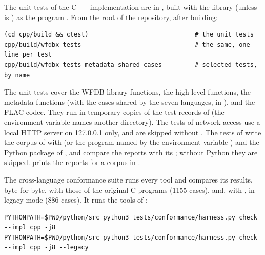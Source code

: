 The unit tests of the C++ implementation are in , built with the library
(unless  is ) as the program
. From the root of the repository, after building:

\begin{lstlisting}[style=shell]
(cd cpp/build && ctest)                             # the unit tests
cpp/build/wfdbx_tests                               # the same, one line per test
cpp/build/wfdbx_tests metadata_shared_cases         # selected tests, by name
\end{lstlisting}

The unit tests cover the WFDB library functions, the high-level functions, the metadata
functions (with the cases shared by the seven languages, in ),
 and the FLAC codec. They run in temporary copies of the test records
of  (the environment variable  names another
directory). The tests of network access use a local HTTP server on 127.0.0.1 only, and
are skipped without . The tests of  write the corpus of
 with  (or the program named by the
environment variable ) and the Python package of ,
and compare the reports with its ; without Python they are skipped.
 prints the reports for a corpus in .

The cross-language conformance suite runs every tool and compares its results, byte for
byte, with those of the original C programs (1155 cases), and, with , in
legacy mode (886 cases). It runs the tools of :

\begin{lstlisting}[style=shell]
PYTHONPATH=$PWD/python/src python3 tests/conformance/harness.py check --impl cpp -j8
PYTHONPATH=$PWD/python/src python3 tests/conformance/harness.py check --impl cpp -j8 --legacy
\end{lstlisting}
